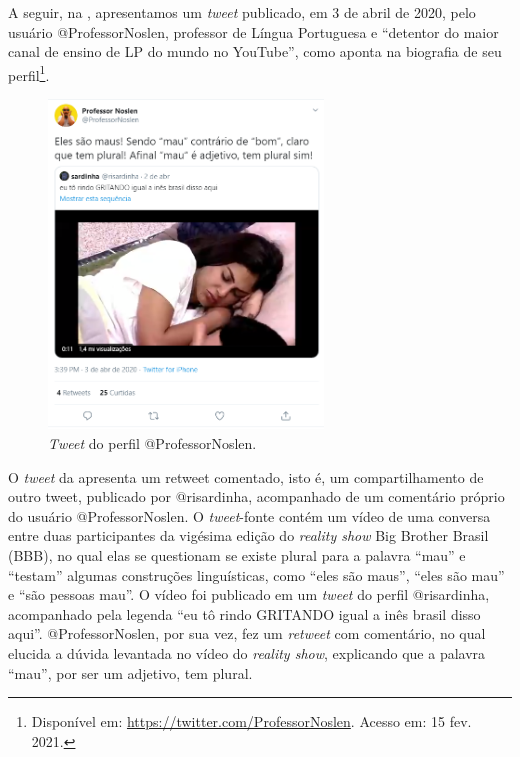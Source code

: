 \documentclass{textolivre}
\begin{document}
A seguir, na , apresentamos um \textit{tweet} publicado, em 3 de abril de 2020, pelo usuário @ProfessorNoslen, professor de Língua Portuguesa e “detentor do maior canal de ensino de LP do mundo no YouTube”, como aponta na biografia de seu perfil\footnote{Disponível em: \url{https://twitter.com/ProfessorNoslen}. Acesso em: 15 fev. 2021.}.

\begin{figure}[htbp]
 \centering
 \includegraphics[width=0.65\textwidth]{Fig6.png}
 \caption{\textit{Tweet} do perfil @ProfessorNoslen.}
 \label{fig06}
\end{figure}

O \textit{tweet} da  apresenta um retweet comentado, isto é, um compartilhamento de outro tweet, publicado por @risardinha, acompanhado de um comentário próprio do usuário @ProfessorNoslen. O \textit{tweet}-fonte contém um vídeo de uma conversa entre duas participantes da vigésima edição do \textit{reality show} Big Brother Brasil (BBB), no qual elas se questionam se existe plural para a palavra “mau” e “testam” algumas construções linguísticas, como “eles são maus”, “eles são mau” e “são pessoas mau”. O vídeo foi publicado em um \textit{tweet} do perfil @risardinha, acompanhado pela legenda “eu tô rindo GRITANDO igual a inês brasil disso aqui”. @ProfessorNoslen, por sua vez, fez um \textit{retweet} com comentário, no qual elucida a dúvida levantada no vídeo do \textit{reality show}, explicando que a palavra “mau”, por ser um adjetivo, tem plural.
\end{document}
